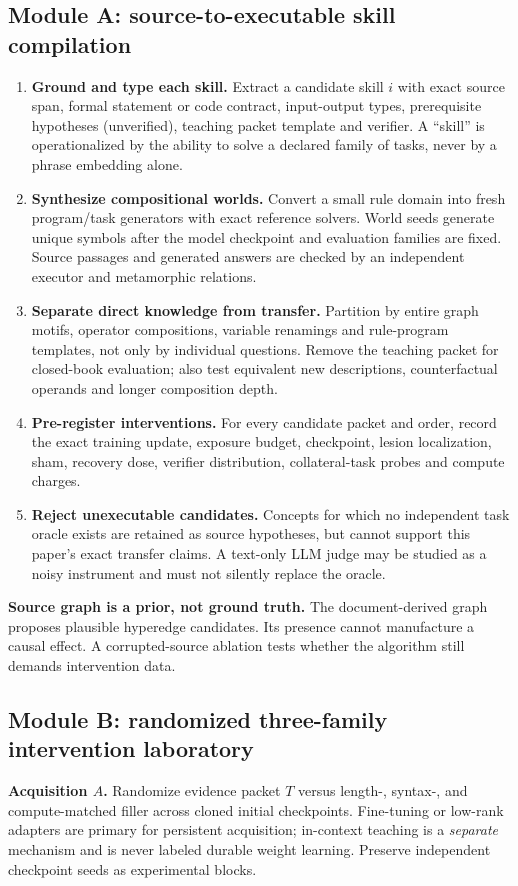 \documentclass[11pt,a4paper]{article}
\theoremstyle{definition}\newtheorem{definition}[theorem]{Definition}
\theoremstyle{remark}\newtheorem{remark}[theorem]{Remark}
\begin{document}
\subsection{Module A: source-to-executable skill compilation}
\begin{enumerate}
\item \textbf{Ground and type each skill.} Extract a candidate skill $i$ with exact source span, formal statement or code contract, input-output types, prerequisite hypotheses (unverified), teaching packet template and verifier. A ``skill'' is operationalized by the ability to solve a declared family of tasks, never by a phrase embedding alone.
\item \textbf{Synthesize compositional worlds.} Convert a small rule domain into fresh program/task generators with exact reference solvers. World seeds generate unique symbols after the model checkpoint and evaluation families are fixed. Source passages and generated answers are checked by an independent executor and metamorphic relations.
\item \textbf{Separate direct knowledge from transfer.} Partition by entire graph motifs, operator compositions, variable renamings and rule-program templates, not only by individual questions. Remove the teaching packet for closed-book evaluation; also test equivalent new descriptions, counterfactual operands and longer composition depth.
\item \textbf{Pre-register interventions.} For every candidate packet and order, record the exact training update, exposure budget, checkpoint, lesion localization, sham, recovery dose, verifier distribution, collateral-task probes and compute charges.
\item \textbf{Reject unexecutable candidates.} Concepts for which no independent task oracle exists are retained as source hypotheses, but cannot support this paper's exact transfer claims. A text-only LLM judge may be studied as a noisy instrument and must not silently replace the oracle.
\end{enumerate}
\textbf{Source graph is a prior, not ground truth.} The document-derived graph proposes plausible hyperedge candidates. Its presence cannot manufacture a causal effect. A corrupted-source ablation tests whether the algorithm still demands intervention data.

\subsection{Module B: randomized three-family intervention laboratory}
\textbf{Acquisition $A$.} Randomize evidence packet $T$ versus length-, syntax-, and compute-matched filler across cloned initial checkpoints. Fine-tuning or low-rank adapters are primary for persistent acquisition; in-context teaching is a \emph{separate} mechanism and is never labeled durable weight learning. Preserve independent checkpoint seeds as experimental blocks.
\end{document}
